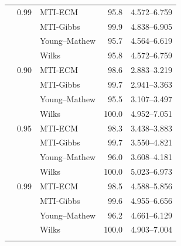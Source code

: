 \begin{longtable}{@{}rrlrr@{}}
\addlinespace[0.3em]
500 & 0.99 & MTI-ECM & 95.8 & 4.572--6.759 \\
 &  & MTI-Gibbs & 99.9 & 4.838--6.905 \\
 &  & Young--Mathew & 95.7 & 4.564--6.619 \\
 &  & Wilks & 95.8 & 4.572--6.759 \\
\addlinespace[0.3em]
1000 & 0.90 & MTI-ECM & 98.6 & 2.883--3.219 \\
 &  & MTI-Gibbs & 99.7 & 2.941--3.363 \\
 &  & Young--Mathew & 95.5 & 3.107--3.497 \\
 &  & Wilks & 100.0 & 4.952--7.051 \\
\addlinespace[0.3em]
1000 & 0.95 & MTI-ECM & 98.3 & 3.438--3.883 \\
 &  & MTI-Gibbs & 99.7 & 3.550--4.821 \\
 &  & Young--Mathew & 96.0 & 3.608--4.181 \\
 &  & Wilks & 100.0 & 5.023--6.973 \\
\addlinespace[0.3em]
1000 & 0.99 & MTI-ECM & 98.5 & 4.588--5.856 \\
 &  & MTI-Gibbs & 99.6 & 4.955--6.656 \\
 &  & Young--Mathew & 96.2 & 4.661--6.129 \\
 &  & Wilks & 100.0 & 4.903--7.004 \\
\addlinespace[0.3em]
\end{longtable}
\clearpage
